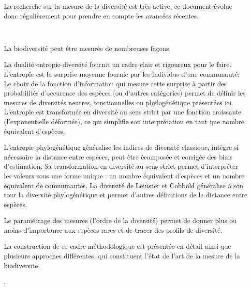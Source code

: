 \documentclass[
  11pt,
  french,
  a4paper,
  extrafontsizes,onecolumn,openright
  ]{memoir}
\makeatletter
\newcommand{\MemoirChapStyle}{companion}
\newcommand{\MemoirPageStyle}{companion}
\newlength\widthw %
\newcommand*{\SmallMargins}{
  \setlrmarginsandblock{1in}{1in}{*}
  \setmarginnotes{0.1in}{0.1in}{0.1in}
  \setulmarginsandblock{1.5in}{1in}{*}
  \checkandfixthelayout
  \ch@ngetext
  \clearpage
  \setlength{\widthw}{\textwidth+\marginparsep+\marginparwidth}
  \footnotesatfoot
  \chapterstyle{\MemoirChapStyle}	%
  \pagestyle{\MemoirPageStyle}
}
\newcommand{\evenpage}{
  \clearpage
	\strictpagecheck %
  \checkoddpage
  \ifoddpage
    \thispagestyle{empty}
    ~\\ %
    \newpage
  \else
  \fi
}
\makeatother
\begin{document}
La recherche sur la mesure de la diversité est très active, ce document évolue donc régulièrement pour prendre en compte les avancées récentes.



\backmatter
\SmallMargins

\twocolumn
\renewcommand*{\bibfont}{\scriptsize}
\printbibliography
\onecolumn










\evenpage
\SmallMargins
\thispagestyle{empty}

\begin{normalsize}

\begin{description}

\item[Résumé]
La biodiversité peut être mesurée de nombreuses façons.

La dualité entropie-diversité fournit un cadre clair et rigoureux pour le faire.
L'entropie est la surprise moyenne fournie par les individus d'une communauté.
Le choix de la fonction d'information qui mesure cette surprise à partir des probabilités d'occurence des espèces (ou d'autres catégories) permet de définir les mesures de diversités neutres, fonctionnelles ou phylogénétique présentées ici.
L'entropie est transformée en diversité au sens strict par une fonction croissante (l'exponentielle déformée), ce qui simplifie son interprétation en tant que nombre équivalent d'espèces.

L'entropie phylogénétique généralise les indices de diversité classique, intègre si nécessaire la distance entre espèces, peut être écomposée et corrigée des biais d'estimation.
Sa transformation en diversité au sens strict permet d'interpréter les valeurs sous une forme unique : un nombre équivalent d'espèces et un nombre équivalent de communautés.
La diversité de Leinster et Cobbold généralise à son tour la diversité phylogénétique et permet d'autres définitions de la distance entre espèces.

Le paramétrage des mesures (l'ordre de la diversité) permet de donner plus ou moins d'importance aux espèces rares et de tracer des profils de diversité.

La construction de ce cadre méthodologique est présentée en détail ainsi que plusieurs approches différentes, qui constituent l'état de l'art de la mesure de la biodiversité.
\item[]
.
~\\

\end{description}

\end{normalsize}
\end{document}
